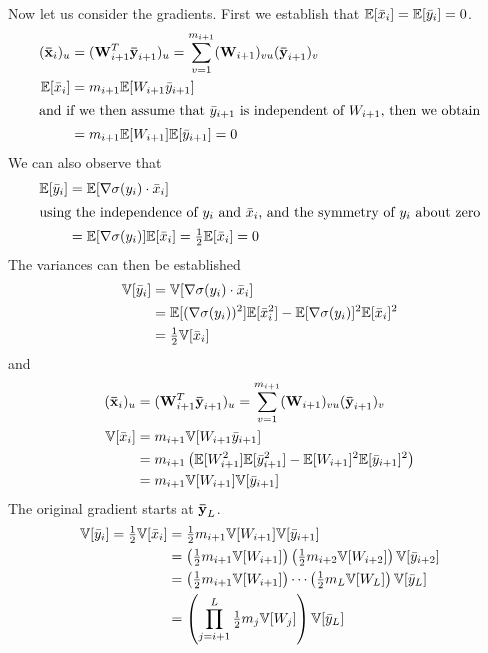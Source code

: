 Now let us consider the gradients.
First we establish that $\mathbb{E}[\bar{x}_{i}] = \mathbb{E}[\bar{y}_{i}] = 0$.
\begin{align}
(\boldsymbol{\mathbf{\bar{x}}}_{i})_{u} & = (\boldsymbol{\mathbf{W}}_{i+1}^{T} \boldsymbol{\mathbf{\bar{y}}}_{i+1})_{u} = \sum_{v = 1}^{m_{i+1}} (\boldsymbol{\mathbf{W}}_{i+1})_{v u} (\boldsymbol{\mathbf{\bar{y}}}_{i+1})_{v} \\
\mathbb{E}[\bar{x}_{i}] & = m_{i+1} \mathbb{E}[W_{i+1} \bar{y}_{i+1}] \\
\intertext{and if we then assume that $\bar{y}_{i+1}$ is independent of $W_{i+1}$, then we obtain}
& = m_{i+1} \mathbb{E}[W_{i+1}] \mathbb{E}[\bar{y}_{i+1}] = 0
\end{align}
We can also observe that
\begin{align}
\mathbb{E}[\bar{y}_{i}] & = \mathbb{E}[\nabla\sigma(y_{i}) \cdot \bar{x}_{i}] \\
\intertext{using the independence of $y_{i}$ and $\bar{x}_{i}$, and the symmetry of $y_{i}$ about zero}
& =  \mathbb{E}[\nabla\sigma(y_{i})] \mathbb{E}[\bar{x}_{i}] = \tfrac{1}{2} \mathbb{E}[\bar{x}_{i}] = 0
\end{align}
The variances can then be established
\begin{align}
\mathbb{V}[\bar{y}_{i}]
& = \mathbb{V}[\nabla \sigma(y_{i}) \cdot \bar{x}_{i}] \\
& = \mathbb{E}[(\nabla \sigma(y_{i}))^2] \mathbb{E}[\bar{x}_{i}^2] - \mathbb{E}[\nabla \sigma(y_{i})]^2 \mathbb{E}[\bar{x}_{i}]^2 \\
& = \tfrac{1}{2} \mathbb{V}[\bar{x}_{i}]
\end{align}
and
\begin{align}
(\boldsymbol{\mathbf{\bar{x}}}_{i})_{u} & = (\boldsymbol{\mathbf{W}}_{i+1}^{T} \boldsymbol{\mathbf{\bar{y}}}_{i+1})_{u} = \sum_{v = 1}^{m_{i+1}} (\boldsymbol{\mathbf{W}}_{i+1})_{v u} (\boldsymbol{\mathbf{\bar{y}}}_{i+1})_{v} \\
\mathbb{V}[\bar{x}_{i}] & = m_{i+1} \mathbb{V}[W_{i+1} \bar{y}_{i+1}] \\
& = m_{i+1} \left( \mathbb{E}[W_{i+1}^2] \mathbb{E}[\bar{y}_{i+1}^2] - \mathbb{E}[W_{i+1}]^2 \mathbb{E}[\bar{y}_{i+1}]^2 \right) \\
& = m_{i+1} \mathbb{V}[W_{i+1}] \mathbb{V}[\bar{y}_{i+1}]
\end{align}
The original gradient starts at $\boldsymbol{\mathbf{\bar{y}}}_{L}$.
\begin{align}
\mathbb{V}[\bar{y}_{i}] = \tfrac{1}{2} \mathbb{V}[\bar{x}_{i}] & = \tfrac{1}{2} m_{i+1} \mathbb{V}[W_{i+1}] \mathbb{V}[\bar{y}_{i+1}] \\
& = \left(\tfrac{1}{2} m_{i+1} \mathbb{V}[W_{i+1}]\right) \left(\tfrac{1}{2} m_{i+2} \mathbb{V}[W_{i+2}]\right) \mathbb{V}[\bar{y}_{i+2}] \\
& = \left(\tfrac{1}{2} m_{i+1} \mathbb{V}[W_{i+1}]\right) \cdots \left(\tfrac{1}{2} m_{L} \mathbb{V}[W_{L}]\right) \mathbb{V}[\bar{y}_{L}] \\
& = \left( \prod_{j = i+1}^{L} \tfrac{1}{2} m_{j} \mathbb{V}[W_{j}] \right) \mathbb{V}[\bar{y}_{L}]
\end{align}
